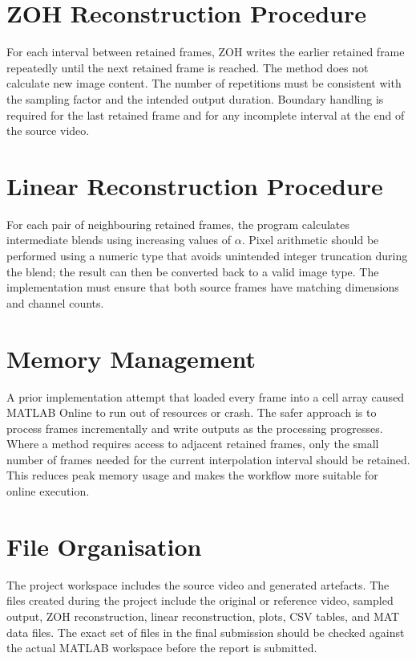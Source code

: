 \documentclass[12pt,a4paper,oneside]{report}
\begin{document}
\section{ZOH Reconstruction Procedure}
For each interval between retained frames, ZOH writes the earlier retained frame repeatedly until the next retained frame is reached. The method does not calculate new image content. The number of repetitions must be consistent with the sampling factor and the intended output duration. Boundary handling is required for the last retained frame and for any incomplete interval at the end of the source video.

\section{Linear Reconstruction Procedure}
For each pair of neighbouring retained frames, the program calculates intermediate blends using increasing values of $\alpha$. Pixel arithmetic should be performed using a numeric type that avoids unintended integer truncation during the blend; the result can then be converted back to a valid image type. The implementation must ensure that both source frames have matching dimensions and channel counts.

\section{Memory Management}
A prior implementation attempt that loaded every frame into a cell array caused MATLAB Online to run out of resources or crash. The safer approach is to process frames incrementally and write outputs as the processing progresses. Where a method requires access to adjacent retained frames, only the small number of frames needed for the current interpolation interval should be retained. This reduces peak memory usage and makes the workflow more suitable for online execution.

\section{File Organisation}
The project workspace includes the source video and generated artefacts. The files created during the project include the original or reference video, sampled output, ZOH reconstruction, linear reconstruction, plots, CSV tables, and MAT data files. The exact set of files in the final submission should be checked against the actual MATLAB workspace before the report is submitted.
\end{document}
